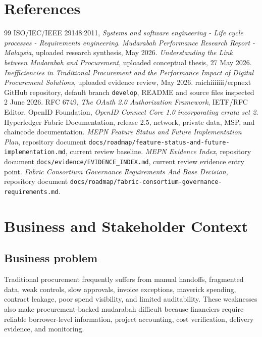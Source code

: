 \documentclass[11pt,a4paper]{article}
\newcommand{\code}[1]{\texttt{#1}}
\begin{document}
\section{References}
\begin{thebibliography}{99}
 ISO/IEC/IEEE 29148:2011, \textit{Systems and software engineering - Life cycle processes - Requirements engineering}.
 \textit{Mudarabah Performance Research Report - Malaysia}, uploaded research synthesis, May 2026.
 \textit{Understanding the Link between Mudarabah and Procurement}, uploaded conceptual thesis, 27 May 2026.
 \textit{Inefficiencies in Traditional Procurement and the Performance Impact of Digital Procurement Solutions}, uploaded evidence review, May 2026.
 raichiiiiiii/erpnext GitHub repository, default branch \code{develop}, README and source files inspected 2 June 2026.
 RFC 6749, \textit{The OAuth 2.0 Authorization Framework}, IETF/RFC Editor.
 OpenID Foundation, \textit{OpenID Connect Core 1.0 incorporating errata set 2}.
 Hyperledger Fabric Documentation, release 2.5, network, private data, MSP, and chaincode documentation.
 \textit{MEPN Feature Status and Future Implementation Plan}, repository document \code{docs/roadmap/feature-status-and-future-implementation.md}, current review baseline.
 \textit{MEPN Evidence Index}, repository document \code{docs/evidence/EVIDENCE\_INDEX.md}, current review evidence entry point.
 \textit{Fabric Consortium Governance Requirements And Base Decision}, repository document \code{docs/roadmap/fabric-consortium-governance-requirements.md}.
\end{thebibliography}

\section{Business and Stakeholder Context}

\subsection{Business problem}
Traditional procurement frequently suffers from manual handoffs, fragmented data, weak controls, slow approvals, invoice exceptions, maverick spending, contract leakage, poor spend visibility, and limited auditability. These weaknesses also make procurement-backed mudarabah difficult because financiers require reliable borrower-level information, project accounting, cost verification, delivery evidence, and monitoring.
\end{document}

